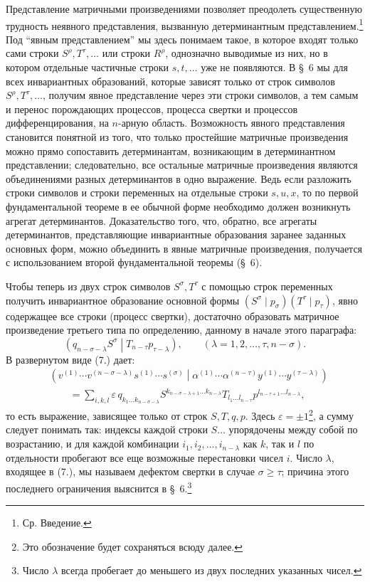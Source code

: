 \documentclass[11pt]{article}
\newcommand{\pair}[2]{\left(#1\middle|#2\right)}
\newcommand{\eps}{\varepsilon}
\begin{document}
Представление матричными произведениями позволяет преодолеть существенную трудность неявного представления, вызванную детерминантным представлением.\footnote{Ср. Введение.} Под ``явным представлением'' мы здесь понимаем такое, в которое входят только сами строки $S^\rho,T^\tau,\ldots$ или строки $R^\rho$, однозначно выводимые из них, но в котором отдельные частичные строки $s,t,\ldots$ уже не появляются. В \S\ 6 мы для всех инвариантных образований, которые зависят только от строк символов $S^\rho,T^\tau,\ldots$, получим явное представление через эти строки символов, а тем самым и перенос порождающих процессов, процесса свертки и процессов дифференцирования, на $n$-арную область. Возможность явного представления становится понятной из того, что только простейшие матричные произведения можно прямо сопоставить детерминантам, возникающим в детерминантном представлении; следовательно, все остальные матричные произведения являются объединениями разных детерминантов в одно выражение. Ведь если разложить строки символов и строки переменных на отдельные строки $s,u,x$, то по первой фундаментальной теореме в ее обычной форме необходимо должен возникнуть агрегат детерминантов. Доказательство того, что, обратно, все агрегаты детерминантов, представляющие инвариантные образования заранее заданных основных форм, можно объединить в явные матричные произведения, получается с использованием второй фундаментальной теоремы (\S\ 6).

Чтобы теперь из двух строк символов $S^\sigma,T^\tau$ с помощью строк переменных получить инвариантное образование основной формы $(S^\sigma\mid p_\sigma)(T^\tau\mid p_\tau)$, явно содержащее все строки (процесс свертки), достаточно образовать матричное произведение третьего типа по определению, данному в начале этого параграфа:
\begin{equation}
 \pair{q_{n-\sigma-\lambda}S^\sigma}{T_{n-\tau}p_{\tau-\lambda}},
 \qquad (\lambda=1,2,\ldots,\tau,n-\sigma).
\tag{7}
\end{equation}
В развернутом виде (7.) дает:
\begin{equation}
\begin{aligned}
&\pair{v^{(1)}\cdots v^{(n-\sigma-\lambda)}s^{(1)}\cdots s^{(\sigma)}}
       {\alpha^{(1)}\cdots\alpha^{(n-\tau)}y^{(1)}\cdots y^{(\tau-\lambda)}} \\
&\qquad =\sum_{i,k,l}\eps\,q_{k_1\ldots k_{n-\sigma-\lambda}}
 S^{k_{n-\sigma-\lambda+1}\ldots k_{n-\lambda}}
 T_{l_1\ldots l_{n-\tau}}
 p^{l_{n-\tau+1}\ldots l_{n-\lambda}},
\end{aligned}
\tag{8}
\end{equation}
то есть выражение, зависящее только от строк $S,T,q,p$. Здесь $\eps=\pm1$\footnote{Это обозначение будет сохраняться всюду далее.}, а сумму следует понимать так: индексы каждой строки $S\ldots$ упорядочены между собой по возрастанию, и для каждой комбинации $i_1,i_2,\ldots,i_{n-\lambda}$ как $k$, так и $l$ по отдельности пробегают все еще возможные перестановки чисел $i$. Число $\lambda$, входящее в (7.), мы называем дефектом свертки в случае $\sigma\geq\tau$; причина этого последнего ограничения выяснится в \S\ 6.\footnote{Число $\lambda$ всегда пробегает до меньшего из двух последних указанных чисел.}
\end{document}
